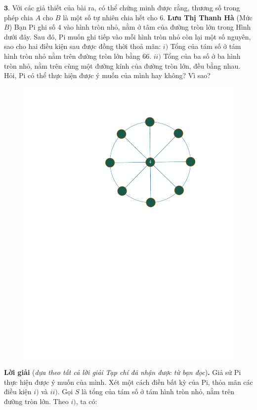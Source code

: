 \begin{multicols}{2}
	$\pmb{3.}$ Với các giả thiết của bài ra, có thể chứng minh được rằng, thương số trong phép chia $A$ cho $B$ là một số tự nhiên chia hết cho $6$.
	\vskip 0.15cm
	\hfill	\textbf{\color{thachthuctoanhoc}Lưu Thị Thanh Hà}
	\vskip 0.15cm
	{}
	(Mức $B$) Bạn Pi ghi số $4$ vào hình tròn nhỏ, nằm ở tâm của đường tròn lớn trong Hình dưới đây. Sau đó, Pi muốn ghi tiếp vào mỗi hình tròn nhỏ còn lại một số nguyên, sao cho hai điều kiện sau được đồng thời thoả mãn: 
	\vskip 0.05cm
	$i)$ Tổng của tám số ở tám hình tròn nhỏ nằm trên đường tròn lớn bằng $66$. 
	\vskip 0.05cm
	$ii)$ Tổng của ba số ở ba hình tròn nhỏ, nằm trên cùng một đường kính của đường tròn lớn, đều bằng nhau. 
	\vskip 0.05cm
	Hỏi, Pi có thể thực hiện được ý muốn của mình hay không? Vì sao?
	\begin{figure}[H]
		\centering
		\vspace*{-10pt}
		\captionsetup{labelformat= empty, justification=centering}
		\includegraphics[width=0.65\linewidth]{P634}
		\vspace*{-10pt}
	\end{figure}
	\textbf{\color{thachthuctoanhoc}Lời giải} (\textit{dựa theo tất cả lời giải Tạp chí đã nhận được từ bạn đọc})\textbf{\color{thachthuctoanhoc}.}
	\vskip 0.05cm
	Giả sử Pi thực hiện được ý muốn của mình.
	\vskip 0.05cm
	Xét một cách điền bất kỳ của Pi, thỏa mãn các điều kiện $i)$ và $ii)$.
	\vskip 0.05cm
	Gọi $S$ là tổng của tám số ở tám hình tròn nhỏ, nằm trên đường tròn lớn. Theo $i)$, ta có:
	\begin{align*}

\end{align*}
\end{multicols}
